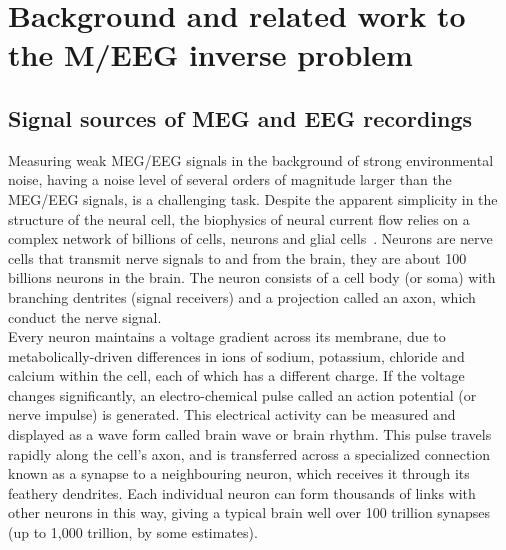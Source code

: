 
\chapter{Background and related work to the M/EEG inverse problem} %
\label{chapter:background} %
\noindent\makebox[\linewidth]{\rule{0.75\paperwidth}{0.4pt}}
\noindent\makebox[\linewidth]{\rule{0.75\paperwidth}{0.4pt}}

\localtableofcontents %

\noindent\makebox[\linewidth]{\rule{0.75\paperwidth}{0.4pt}}
\noindent\makebox[\linewidth]{\rule{0.75\paperwidth}{0.4pt}}

\newpage

\newcommand{\keyword}[1]{\textbf{#1}}
\newcommand{\tabhead}[1]{\textbf{#1}}
\newcommand{\code}[1]{\texttt{#1}}
\newcommand{\file}[1]{\texttt{\bfseries#1}}
\newcommand{\option}[1]{\texttt{\itshape#1}}


\section{Signal sources of MEG and EEG recordings}
Measuring weak MEG/EEG signals in the background of strong environmental noise, having a noise level of several orders of magnitude larger than the MEG/EEG signals, is a challenging task. Despite the apparent simplicity in the structure of the neural cell, the biophysics of neural current flow relies on a complex network of billions of cells, neurons and glial cells~\cite{baillet2001electromagnetic, hodgkin1964conduction}. Neurons are nerve cells that transmit nerve signals to and from the brain, they are about 100 billions neurons in the brain. The neuron consists of a cell body (or soma) with branching dentrites (signal receivers) and a projection called an axon, which conduct the nerve signal.\\

Every neuron maintains a voltage gradient across its membrane, due to metabolically-driven differences in ions of sodium, potassium, chloride and calcium within the cell, each of which has a different charge. If the voltage changes significantly, an electro-chemical pulse called an action potential (or nerve impulse) is generated. This electrical activity can be measured and displayed as a wave form called brain wave or brain rhythm. This pulse travels rapidly along the cell's axon, and is transferred across a specialized connection known as a synapse to a neighbouring neuron, which receives it through its feathery dendrites. Each individual neuron can form thousands of links with other neurons in this way, giving a typical brain well over 100 trillion synapses (up to 1,000 trillion, by some estimates).\\

